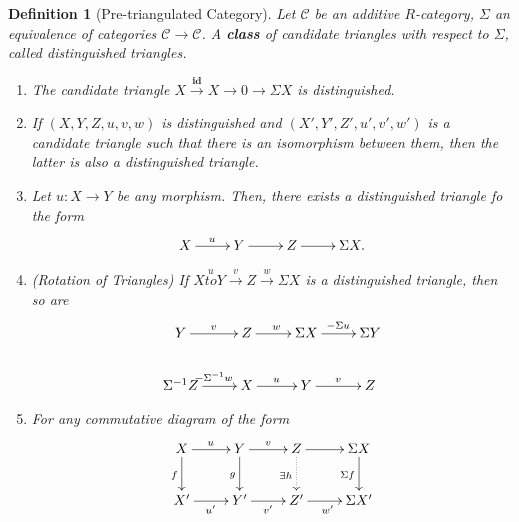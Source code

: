 \documentclass{amsart}
\theoremstyle{thmstyle}
\theoremstyle{defstyle}
\newtheorem{definition}[theorem]{Definition}
\newcommand{\id}{\mathbf{id}}
\begin{document}
\begin{definition}[Pre-triangulated Category]
    Let $\mathcal C$ be an additive $R$-category, $\Sigma$ an equivalence of categories $\mathcal C\to\mathcal C$. A \textbf{class} of candidate triangles with respect to $\Sigma$, called \emph{distinguished triangles}.
    \begin{enumerate}
        \item The candidate triangle $X\stackrel{\id}{\longrightarrow}X\to0\to\Sigma X$ is distinguished.
        \item If $(X,Y,Z,u,v,w)$ is distinguished and $(X',Y',Z',u',v',w')$ is a candidate triangle such that there is an isomorphism between them, then the latter is also a distinguished triangle.
        \item Let $u: X\to Y$ be any morphism. Then, there exists a distinguished triangle fo the form 
        \begin{equation*}
            \xymatrix {
                X\ar[r]^u & Y\ar[r] & Z\ar[r] & \Sigma X.
            }
        \end{equation*}
        \item (Rotation of Triangles) If $X\stackrel{u}{to}Y\stackrel{v}{\to} Z\stackrel{w}{\to}\Sigma X$ is a distinguished triangle, then so are 
        \begin{equation*}
            \xymatrix {
                Y\ar[r]^v & Z\ar[r]^w & \Sigma X\ar[r]^{-\Sigma u} & \Sigma Y\\
                \Sigma^{-1}Z\ar[r]^{-\Sigma^{-1}w} & X\ar[r]^u & Y\ar[r]^v & Z
            }
        \end{equation*}
        \item For any commutative diagram of the form 
        \begin{equation*}
            \xymatrix {
                X\ar[r]^u\ar[d]_f & Y\ar[r]^v\ar[d]_g & Z\ar[r]\ar@{.>}[d]_{\exists h} & \Sigma X\ar[d]_{\Sigma f}\\
                X'\ar[r]_{u'} & Y'\ar[r]_{v'} & Z'\ar[r]_{w'} & \Sigma X'
            }
        \end{equation*}
    \end{enumerate}
\end{definition}
\end{document}
